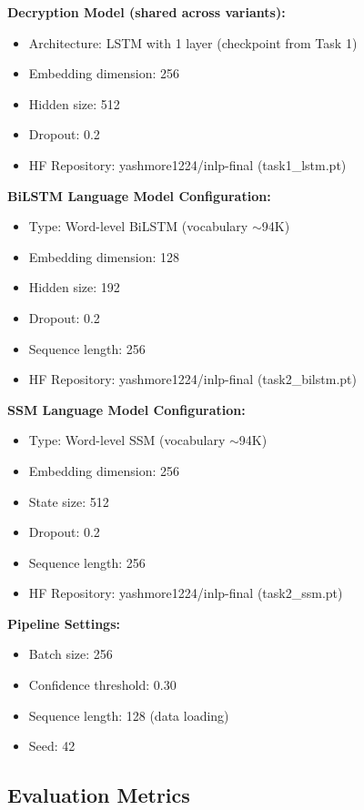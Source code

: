 \documentclass[12pt]{article}
\begin{document}
\textbf{Decryption Model (shared across variants):}
\begin{itemize}
    \item Architecture: LSTM with 1 layer (checkpoint from Task 1)
    \item Embedding dimension: 256
    \item Hidden size: 512
    \item Dropout: 0.2
    \item HF Repository: yashmore1224/inlp-final (task1\_lstm.pt)
\end{itemize}

\textbf{BiLSTM Language Model Configuration:}
\begin{itemize}
    \item Type: Word-level BiLSTM (vocabulary $\sim$94K)
    \item Embedding dimension: 128
    \item Hidden size: 192
    \item Dropout: 0.2
    \item Sequence length: 256
    \item HF Repository: yashmore1224/inlp-final (task2\_bilstm.pt)
\end{itemize}

\textbf{SSM Language Model Configuration:}
\begin{itemize}
    \item Type: Word-level SSM (vocabulary $\sim$94K)
    \item Embedding dimension: 256
    \item State size: 512
    \item Dropout: 0.2
    \item Sequence length: 256
    \item HF Repository: yashmore1224/inlp-final (task2\_ssm.pt)
\end{itemize}

\textbf{Pipeline Settings:}
\begin{itemize}
    \item Batch size: 256
    \item Confidence threshold: 0.30
    \item Sequence length: 128 (data loading)
    \item Seed: 42
\end{itemize}

\subsection{Evaluation Metrics}
\end{document}
